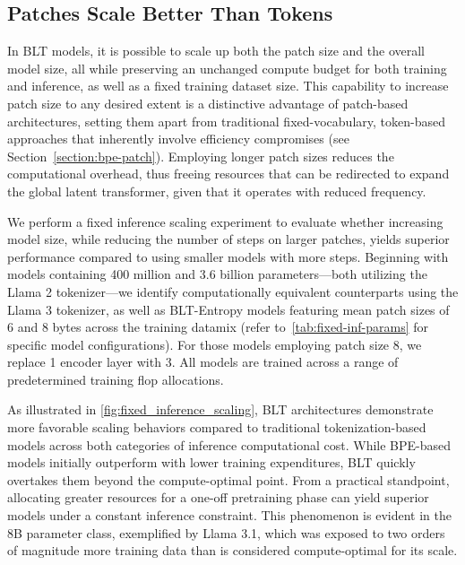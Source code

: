 \subsection{Patches Scale Better Than Tokens} In {\textsc BLT} models, it is possible to scale up both the patch size and the overall model size, all while preserving an unchanged compute budget for both training and inference, as well as a fixed training dataset size. This capability to increase patch size to any desired extent is a distinctive advantage of patch-based architectures, setting them apart from traditional fixed-vocabulary, token-based approaches that inherently involve efficiency compromises (see Section~\ref{section:bpe-patch}). Employing longer patch sizes reduces the computational overhead, thus freeing resources that can be redirected to expand the global latent transformer, given that it operates with reduced frequency.

We perform a fixed inference scaling experiment to evaluate whether increasing model size, while reducing the number of steps on larger patches, yields superior performance compared to using smaller models with more steps. Beginning with models containing 400 million and 3.6 billion parameters—both utilizing the Llama 2 tokenizer—we identify computationally equivalent counterparts using the Llama 3 tokenizer, as well as {\textsc BLT}-Entropy models featuring mean patch sizes of 6 and 8 bytes across the training datamix (refer to~\autoref{tab:fixed-inf-params} for specific model configurations). For those models employing patch size 8, we replace 1 encoder layer with 3. All models are trained across a range of predetermined training flop allocations.

As illustrated in \autoref{fig:fixed_inference_scaling}, {\textsc BLT} architectures demonstrate more favorable scaling behaviors compared to traditional tokenization-based models across both categories of inference computational cost. While BPE-based models initially outperform with lower training expenditures, {\textsc BLT} quickly overtakes them beyond the compute-optimal point. From a practical standpoint, allocating greater resources for a one-off pretraining phase can yield superior models under a constant inference constraint. This phenomenon is evident in the 8B parameter class, exemplified by Llama 3.1, which was exposed to two orders of magnitude more training data than is considered compute-optimal for its scale.

